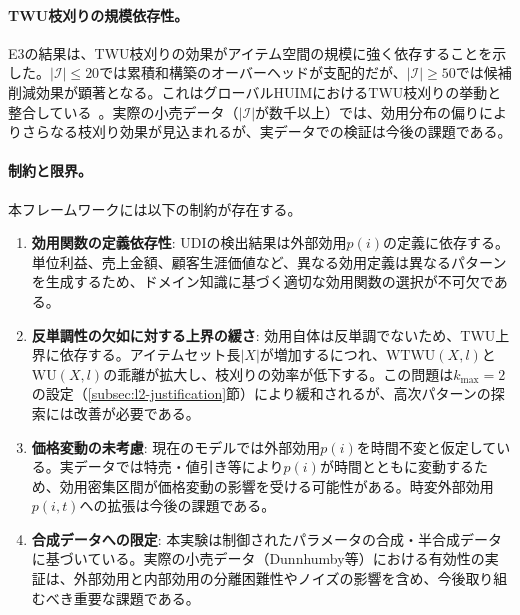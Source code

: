 \paragraph{TWU枝刈りの規模依存性。}
E3の結果は、TWU枝刈りの効果がアイテム空間の規模に強く依存することを示した。$|\mathcal{I}| \leq 20$では累積和構築のオーバーヘッドが支配的だが、$|\mathcal{I}| \geq 50$では候補削減効果が顕著となる。これはグローバルHUIMにおけるTWU枝刈りの挙動と整合している~\cite{fournier2019survey}。実際の小売データ（$|\mathcal{I}|$が数千以上）では、効用分布の偏りによりさらなる枝刈り効果が見込まれるが、実データでの検証は今後の課題である。

\paragraph{制約と限界。}
本フレームワークには以下の制約が存在する。
\begin{enumerate}
    \item \textbf{効用関数の定義依存性}: UDIの検出結果は外部効用$p(i)$の定義に依存する。単位利益、売上金額、顧客生涯価値など、異なる効用定義は異なるパターンを生成するため、ドメイン知識に基づく適切な効用関数の選択が不可欠である。
    \item \textbf{反単調性の欠如に対する上界の緩さ}: 効用自体は反単調でないため、TWU上界に依存する。アイテムセット長$|X|$が増加するにつれ、$\text{WTWU}(X, l)$と$\text{WU}(X, l)$の乖離が拡大し、枝刈りの効率が低下する。この問題は$k_{\max} = 2$の設定（\ref{subsec:l2-justification}節）により緩和されるが、高次パターンの探索には改善が必要である。
    \item \textbf{価格変動の未考慮}: 現在のモデルでは外部効用$p(i)$を時間不変と仮定している。実データでは特売・値引き等により$p(i)$が時間とともに変動するため、効用密集区間が価格変動の影響を受ける可能性がある。時変外部効用$p(i, t)$への拡張は今後の課題である。
    \item \textbf{合成データへの限定}: 本実験は制御されたパラメータの合成・半合成データに基づいている。実際の小売データ（Dunnhumby等）における有効性の実証は、外部効用と内部効用の分離困難性やノイズの影響を含め、今後取り組むべき重要な課題である。
\end{enumerate}
